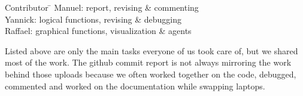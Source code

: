 
\begin{tabbing}
Contributor \= \kill
Manuel: \> report, revising \& commenting\\
Yannick: \> logical functions, revising \& debugging \\
Raffael: \> graphical functions, visualization \& agents \\
\end{tabbing}

Listed above are only the main tasks everyone of us took care of, but we shared most of the work. The github commit report is not always mirroring the work behind those uploads because we often worked together on the code, debugged, commented and worked on the documentation while swapping laptops.
